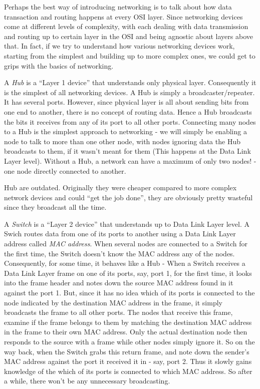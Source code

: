 Perhaps the best way of introducing networking is to talk about how data transaction and routing happens at every OSI layer. Since networking devices come at different levels of complexity, with each dealing with data transmission and routing up to certain layer in the OSI and being agnostic about layers above that. In fact, if we try to understand how various networking devices work, starting from the simplest and building up to more complex ones, we could get to grips with the basics of networking.

A \emph{Hub} is a ``Layer 1 device'' that understands only physical layer. Consequently it is the simplest of all networking devices. A Hub is simply a broadcaster/repeater. It has several ports. However, since physical layer is all about sending bits from one end to another, there is no concept of routing data. Hence a Hub broadcasts the bits it receives from any of its port to all other ports. Connecting many nodes to a Hub is the simplest approach to networking - we will simply be enabling a node to talk to more than one other node, with nodes ignoring data the Hub broadcasts to them, if it wasn't meant for them (This happens at the Data Link Layer level).  Without a Hub, a network can have a maximum of only two nodes! - one node directly connected to another. 

Hub are outdated. Originally they were cheaper compared to more complex network devices and could ``get the job done'', they are obviously pretty wasteful since they broadcast all the time. 

A \emph{Switch} is a ``Layer 2 device'' that understands up to Data Link Layer level. A Swich routes data from one of its ports to another using a Data Link Layer address called \emph{MAC address}. When several nodes are connected to a Switch for the first time, the Switch doesn't know the MAC address any of the nodes. Consequently, for some time, it behaves like a Hub - When a Switch receives a Data Link Layer frame on one of its ports, say, port 1, for the first time, it looks into the frame header and notes down the source MAC address found in it against the port 1. But, since it has no idea which of its ports is connected to the node indicated by the destination MAC address in the frame, it simply broadcasts the frame to all other ports. The nodes that receive this frame, examine if the frame belongs to them by matching the destination MAC address in the frame to their own MAC address. Only the actual destination node then responds to the source with a frame while other nodes simply ignore it. So on the way back, when the Switch grabs this return frame, and note down the sender's MAC address against the port it received it in - say, port 2.  Thus it slowly gains knowledge of the which of its ports is connected to which MAC address. So after a while, there won't be any unnecessary broadcasting.

